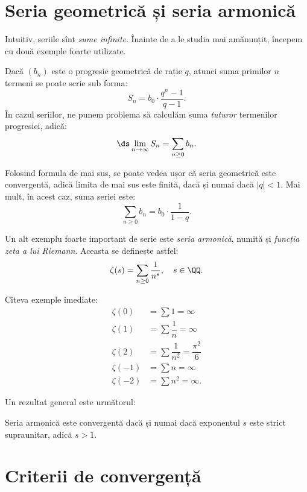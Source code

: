 
\section{Seria geometrică și seria armonică}

Intuitiv, seriile sînt \emph{sume infinite}. Înainte de a le studia mai amănunțit,
începem cu două exemple foarte utilizate.

Dacă $ (b_n) $ este o progresie geometrică de rație $ q $, atunci suma primilor
$ n $ termeni se poate scrie sub forma:
\[
    S_n = b_0 \cdot \dfrac{q^n - 1}{q - 1}.
\]
În cazul seriilor, ne punem problema să calculăm suma \emph{tuturor} termenilor
progresiei, adică:
\[
    \ds\lim_{n \to \infty} S_n = \sum_{n \geq 0} b_n.
\]

Folosind formula de mai sus, se poate vedea ușor că seria geometrică
este convergentă, adică limita de mai sus este finită, dacă și numai
dacă $ |q| < 1 $. Mai mult, în acest caz, suma seriei este:
\[
    \sum_{n \geq 0} b_n = b_0 \cdot \dfrac{1}{1 - q}.
\]

\vspace{1cm}

Un alt exemplu foarte important de serie este \emph{seria armonică}, numită
și \emph{funcția zeta a lui Riemann}. Aceasta se definește astfel:
\[
    \zeta(s) = \sum_{n \geq 0} \dfrac{1}{n^s}, \quad s \in \QQ.
\]

Cîteva exemple imediate:
\begin{align*}
    \zeta(0) &= \sum 1 = \infty \\
    \zeta(1) &= \sum \dfrac{1}{n} = \infty \\
    \zeta(2) &= \sum \dfrac{1}{n^2} = \dfrac{\pi^2}{6} \\
    \zeta(-1) &= \sum n = \infty \\
    \zeta(-2) &= \sum n^2 = \infty.
\end{align*}

Un rezultat general este următorul:
\begin{theorem}\label{thm:zeta-conv}
    Seria armonică este convergentă dacă și numai dacă exponentul $ s $
    este strict supraunitar, adică $ s > 1 $.
\end{theorem}

\section{Criterii de convergență}

